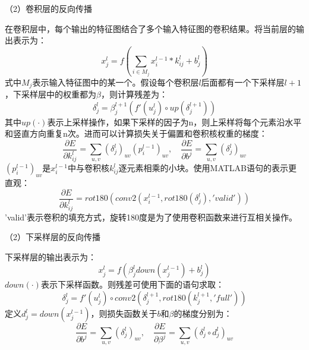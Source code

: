 （2）卷积层的反向传播

在卷积层中，每个输出的特征图结合了多个输入特征图的卷积结果。将当前层的输出表示为：
\begin{equation}
x_j^l = f \left( \sum\limits_{i \in M_j} x_i^{l-1} * k_{ij}^l + b_j^l \right)
\end{equation}
式中$M_j$表示输入特征图中的某一个。假设每个卷积层$l$后面都有一个下采样层$l+1$，下采样层中的权重都为$\beta$，则计算残差为：
\begin{equation}
\delta_j^l = \beta_j^{l+1} (f'(u_j^l) \circ up(\delta_j^{l+1})) \label{eq:3_1_残差_卷积层}
\end{equation}
其中$up(\cdot)$表示上采样操作，如果下采样的因子为n，则上采样将每个元素沿水平和竖直方向重复n次。进而可以计算损失关于偏置和卷积核权重的梯度：
\begin{equation}
\frac{\partial E}{\partial k_{ij}^l} = \sum\limits_{u,v} (\delta_j^l)_{uv} (p_i^{l-1})_{uv} , \quad
\frac{\partial E}{\partial b^j}  = \sum\limits_{u,v} (\delta_j^l)_{uv}
\end{equation}
$(p_i^{l-1})_{uv}$是$x_i^{l-1}$中与卷积核$k_{ij}^l$逐元素相乘的小块。使用MATLAB语句的表示更直观：
\begin{equation}
\frac{\partial E}{\partial k_{ij}^l} = rot180(conv2(x_i^{l-1}, rot180(\delta_j^l), 'valid'))
\end{equation}
'valid'表示卷积的填充方式，旋转180度是为了使用卷积函数来进行互相关操作。

（2）下采样层的反向传播

下采样层的输出表示为：
\begin{equation}
x_j^l = f \left( \beta_j^l down(x_j^{l-1}) + b_j^l \right)
\end{equation}
$down(\cdot)$表示下采样函数。则残差可使用下面的语句求取：
\begin{equation}
\delta_j^l = f'(u_j^l) \circ conv2(\delta_j^{l+1}, rot180(k_j^{l+1}, 'full'))
\end{equation}
定义$d_j^l = down(x_j^{l-1})$，则损失函数关于$b$和$\beta$的梯度分别为：
\begin{equation}
\frac{\partial E}{\partial b^j}  = \sum\limits_{u,v} (\delta_j^l)_{uv} , \quad
\frac{\partial E}{\partial \beta^j} = \sum\limits_{u,v} (\delta_j^l \circ d_j^l)_{uv}
\end{equation}

